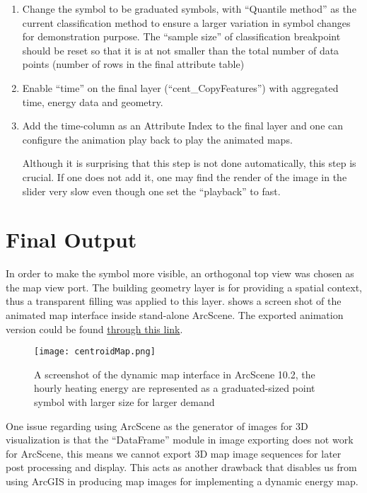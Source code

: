 \begin{enumerate}[1)]
\item Change the symbol to be graduated symbols, with ``Quantile
  method'' as the current classification method to ensure a larger
  variation in symbol changes for demonstration purpose. The ``sample
  size'' of classification breakpoint should be reset so that it is at
  not smaller than the total number of data points (number of rows in
  the final attribute table) 
  
\item Enable ``time'' on the final layer (``cent\_CopyFeatures'') with
  aggregated time, energy data and geometry.

\item Add the time-column as an Attribute Index to the final layer and
  one can configure the animation play back to play the animated
  maps. 

  Although it is surprising that this step is not done automatically,
  this step is crucial. If one does not add it, one may find the
  render of the image in the slider very slow even though one set the
  ``playback'' to fast.
\end{enumerate}

\section{Final Output}
In order to make the symbol more visible, an orthogonal top view was
chosen as the map view port. The building geometry layer is for
providing a spatial context, thus a transparent filling was applied to
this layer.  shows a screen shot of the animated
map interface inside stand-alone ArcScene. The exported animation
version could be found
\href{http://www.armechxyj.com/energy-mapping.html#slowAnime}{through
  this link}.

\begin{figure}[h!]
  \centering
  \texttt{[image: centroidMap.png]}
  \caption[Dynamic Map in ArcScene with Building Centroid]{A
    screenshot of the dynamic map interface in ArcScene 10.2, the
    hourly heating energy are represented as a graduated-sized point
    symbol with larger size for larger demand}
  \label{fig:centroidMap}
\end{figure}

One issue regarding using ArcScene as the generator of images for 3D
visualization is that the ``DataFrame'' module in image exporting does
not work for ArcScene, this means we cannot export 3D map image
sequences for later post processing and display. This acts as another
drawback that disables us from using ArcGIS in producing map images
for implementing a dynamic energy map.